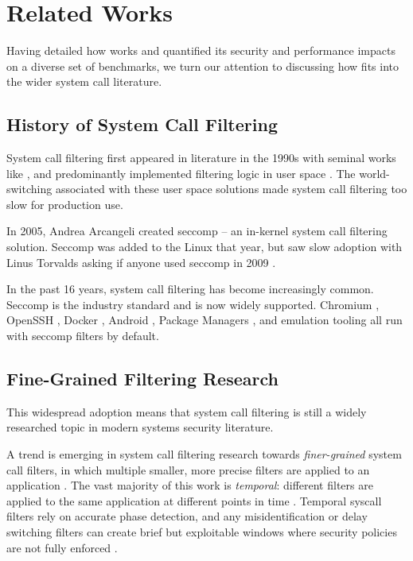 \section{Related Works}\label{sec:related-works}

Having detailed how \af works and quantified its security and performance
impacts on a diverse set of benchmarks, we turn our attention to discussing how
\af fits into the wider system call literature.

\subsection{History of System Call Filtering}

System call filtering first appeared in literature in the 1990s with seminal
works like \textcite{wagner1999janus}, and predominantly implemented filtering
logic in user space \cite{somayaji2000automated, garfinkel2004ostia}. 
The world-switching associated with these user space solutions made
system call filtering too slow for production use.

In 2005, Andrea Arcangeli created seccomp -- an in-kernel system call filtering
solution. Seccomp was added to the Linux that year, but
saw slow adoption with Linus Torvalds asking if anyone used seccomp in
2009 \cite{arcangeli_seccomp_2005, TORVALDS_ANYONE_USES_SECCOMP}. 

In the past 16 years, system call filtering has become increasingly common.
Seccomp is the industry standard and is now widely supported. Chromium
\cite{chromium_sandboxing}, OpenSSH \cite{openssh60}, Docker \cite{docker_seccomp}, Android \cite{android_seccomp_oreo}, Package
Managers \cite{flatpak_seccomp_profile}, and emulation tooling all run with
seccomp filters by default.

\subsection{Fine-Grained Filtering Research}

This widespread adoption means that system call filtering is still a widely
researched topic in modern systems security literature. 

A trend is emerging in system call filtering research towards 
\textit{finer-grained} system call filters, in which multiple smaller, more
precise filters are applied to an application 
\cite{SYSPART, SYSXCHG, ahad2023freepart}. The vast majority of this work is
\textit{temporal}: different filters are applied to the same application at
different points in time \cite{SYSPART, TEMPORAL_SPEC}. Temporal syscall
filters rely on accurate phase detection, and any misidentification or delay
switching filters can create brief but exploitable windows where security
policies are not fully enforced \cite{TEMPORAL_SPEC}. 

